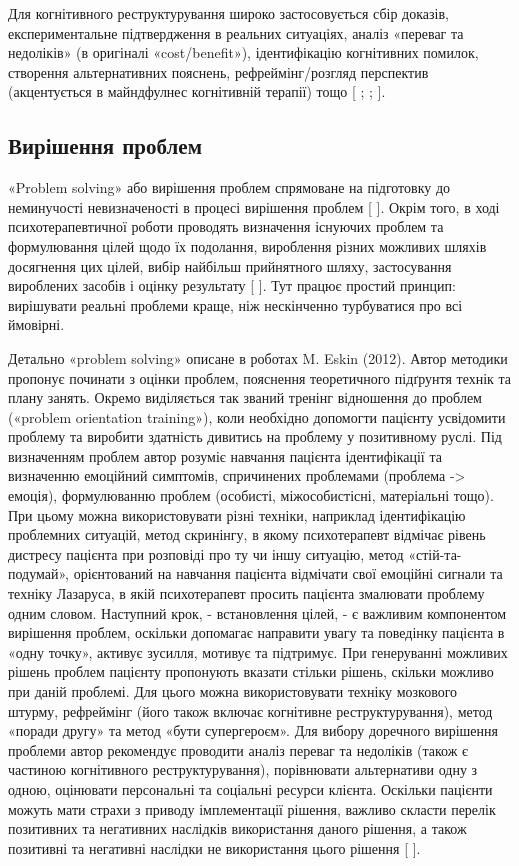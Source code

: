 Для когнітивного реструктурування широко застосовується сбір доказів, експериментальне підтвердження в реальних ситуаціях, аналіз «переваг та недоліків» (в оригіналі «cost/benefit»), ідентифікацію когнітивних помилок, створення альтернативних пояснень, рефреймінг/розгляд перспектив (акцентується в майндфулнес когнітивній терапії) тощо [
\cite{bib19};
\cite{bib20};
\cite{bib21}].

\subsection {Вирішення проблем}
«Problem solving» або вирішення проблем спрямоване на підготовку до неминучості невизначеності в процесі вирішення проблем [
\cite{bib22}]. Окрім того, в ході психотерапевтичної роботи проводять визначення існуючих проблем та формулювання цілей щодо їх подолання, вироблення різних можливих шляхів досягнення цих цілей, вибір найбільш прийнятного шляху, застосування вироблених засобів і оцінку результату [
\cite{bib23}]. Тут працює простий принцип: вирішувати реальні проблеми краще, ніж нескінченно турбуватися про всі ймовірні. 

Детально «problem solving» описане в роботах M. Eskin (2012). Автор методики пропонує починати з оцінки проблем, пояснення теоретичного підґрунтя технік та плану занять. Окремо виділяється так званий тренінг відношення до проблем («problem orientation training»), коли необхідно допомогти пацієнту усвідомити проблему та виробити здатність дивитись на проблему у позитивному руслі. Під визначенням проблем автор розуміє навчання пацієнта ідентифікації та визначенню емоційний симптомів, спричинених проблемами (проблема -> емоція), формулюванню проблем (особисті, міжособистісні, матеріальні тощо). При цьому можна використовувати різні техніки, наприклад ідентифікацію проблемних ситуацій, метод скринінгу, в якому психотерапевт відмічає рівень дистресу пацієнта при розповіді про ту чи іншу ситуацію, метод «стій-та-подумай», орієнтований на навчання пацієнта відмічати свої емоційні сигнали та техніку Лазаруса, в якій психотерапевт просить пацієнта змалювати проблему одним словом. Наступний крок, - встановлення цілей, - є важливим компонентом вирішення проблем, оскільки допомагає направити увагу та поведінку пацієнта в «одну точку», активує зусилля, мотивує та підтримує. При генеруванні можливих рішень проблем пацієнту пропонують вказати стільки рішень, скільки можливо при даній проблемі. Для цього можна використовувати техніку мозкового штурму, рефреймінг (його також включає когнітивне реструктурування), метод «поради другу» та метод «бути супергероєм». Для вибору доречного вирішення проблеми автор рекомендує проводити аналіз переваг та недоліків (також є частиною когнітивного реструктурування), порівнювати альтернативи одну з одною, оцінювати персональні та соціальні ресурси клієнта. Оскільки пацієнти  можуть мати страхи з приводу імплементації рішення, важливо скласти перелік позитивних та негативних наслідків використання даного рішення, а також позитивні та негативні наслідки не використання цього рішення [
\cite{bib24}].


